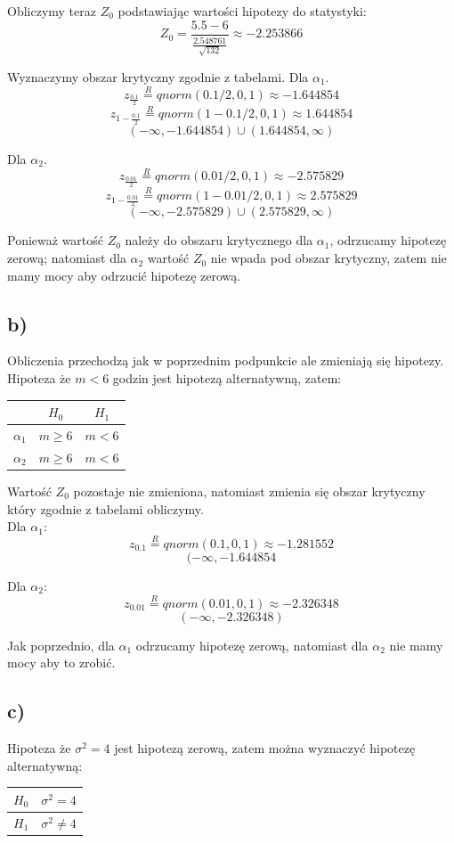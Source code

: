\documentclass{article}
\begin{document}
Obliczymy teraz $Z_0$ podstawiając wartości hipotezy do statystyki:
\[ Z_0 = \frac{5.5 - 6}{\frac{2.548761}{\sqrt{132}}} \approx -2.253866 \]

Wyznaczymy obszar krytyczny zgodnie z tabelami. Dla $\alpha_1$.
\[ z_{\frac{0.1}{2}} \overset{R}{=} qnorm(0.1/2, 0, 1) \approx -1.644854 \]
\[ z_{1 - \frac{0.1}{2}} \overset{R}{=} qnorm(1 - 0.1/2, 0, 1) \approx 1.644854 \]
\[ (-\infty, -1.644854) \cup (1.644854, \infty) \]

Dla $\alpha_2$.
\[ z_{\frac{0.01}{2}} \overset{R}{=} qnorm(0.01/2, 0, 1) \approx -2.575829 \]
\[ z_{1 - \frac{0.01}{2}} \overset{R}{=} qnorm(1 - 0.01/2, 0, 1) \approx 2.575829 \]
\[ (-\infty, -2.575829) \cup (2.575829, \infty) \]

Ponieważ wartość $Z_0$ należy do obszaru krytycznego dla $\alpha_1$, odrzucamy hipotezę zerową; natomiast dla $\alpha_2$ wartość $Z_0$ nie wpada pod obszar krytyczny, zatem nie mamy mocy aby odrzucić hipotezę zerową. 

\subsection{b)}
Obliczenia przechodzą jak w poprzednim podpunkcie ale zmieniają się hipotezy. Hipoteza że $m<6$ godzin jest hipotezą alternatywną, zatem:
\begin{center} \begin{tabular}{|c|c|c|} \hline
 & $H_0$ & $H_1$ \\ \hline
$\alpha_1$ & $m \geq 6$ & $m < 6$ \\ \hline
$\alpha_2$ & $m \geq 6$ & $m < 6$ \\ \hline
\end{tabular} \end{center}

Wartość $Z_0$ pozostaje nie zmieniona, natomiast zmienia się obszar krytyczny który zgodnie z tabelami obliczymy. \\
Dla $\alpha_1$:
\[ z_{0.1} \overset{R}{=} qnorm(0.1, 0, 1) \approx -1.281552 \]
\[ (-\infty, -1.644854 \]

Dla $\alpha_2$:
\[ z_{0.01} \overset{R}{=} qnorm(0.01, 0, 1) \approx -2.326348 \]
\[ (-\infty, -2.326348) \]

Jak poprzednio, dla $\alpha_1$ odrzucamy hipotezę zerową, natomiast dla $\alpha_2$ nie mamy mocy aby to zrobić.

\subsection{c)}
Hipoteza że $\sigma^2 = 4$ jest hipotezą zerową, zatem można wyznaczyć hipotezę alternatywną:
\begin{center} \begin{tabular}{|c|c|} \hline
$H_0$ & $\sigma^2 = 4$ \\ \hline
$H_1$ & $\sigma^2 \neq 4$ \\ \hline
\end{tabular} \end{center}
\end{document}
